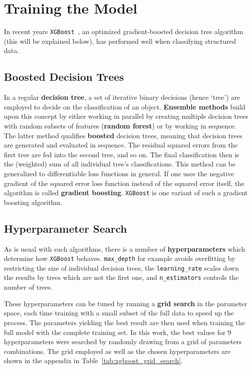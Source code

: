 \section{Training the Model}
In recent years \texttt{XGBoost}~, an optimized gradient-boosted decision tree algorithm (this will be explained below), has performed well when classifying structured data.

\subsection{Boosted Decision Trees}
In a regular \textbf{decision tree}, a set of iterative binary decisions (hence `tree') are employed to decide on the classification of an object. \textbf{Ensemble methods} build upon this concept by either working in parallel by creating multiple decision trees with random subsets of features (\textbf{random forest}) or by working in sequence. The latter method qualifies \textbf{boosted} decision trees, meaning that decision trees are generated and evaluated in sequence. The residual squared errors from the first tree are fed into the second tree, and so on. The final classification then is the (weighted) sum of all individual tree's classifications. This method can be generalized to differentiable loss functions in general. If one uses the negative gradient of the squared error loss function instead of the squared error itself, the algorithm is called \textbf{gradient boosting}. \texttt{XGBoost} is one variant of such a gradient boosting algorithm.

\subsection{Hyperparameter Search}
As is usual with such algorithms, there is a number of \textbf{hyperparameters} which determine how \texttt{XGBoost} behaves. \texttt{max\_depth} for example avoids overfitting by restricting the size of individual decision trees, the \texttt{learning\_rate} scales down the results by trees which are not the first one, and \texttt{n\_estimators} controls the number of trees.

These hyperparameters can be tuned by running a \textbf{grid search} in the parameter space, each time training with a small subset of the full data to speed up the process. The parameters yielding the best result are then used when training the full model with the complete training set. In this work, the best values for 9 hyperparameters were searched by randomly drawing from a grid of parameters combinations. The grid employed as well as the chosen hyperparameters are shown in the appendix in Table~\ref{tab:xgboost_grid_search}.

